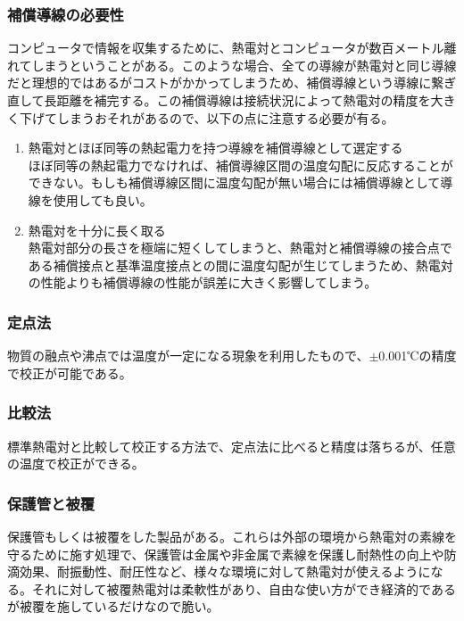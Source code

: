\documentclass[a4j,twoside,openright,11pt]{jarticle}
\begin{document}
\subsubsection{補償導線の必要性}
コンピュータで情報を収集するために、熱電対とコンピュータが数百メートル離れてしまうということがある。このような場合、全ての導線が熱電対と同じ導線だと理想的ではあるがコストがかかってしまうため、補償導線という導線に繋ぎ直して長距離を補完する。この補償導線は接続状況によって熱電対の精度を大きく下げてしまうおそれがあるので、以下の点に注意する必要が有る。
\begin{enumerate}
\item 熱電対とほぼ同等の熱起電力を持つ導線を補償導線として選定する\\
ほぼ同等の熱起電力でなければ、補償導線区間の温度勾配に反応することができない。もしも補償導線区間に温度勾配が無い場合には補償導線として導線を使用しても良い。
\item 熱電対を十分に長く取る\\
熱電対部分の長さを極端に短くしてしまうと、熱電対と補償導線の接合点である補償接点と基準温度接点との間に温度勾配が生じてしまうため、熱電対の性能よりも補償導線の性能が誤差に大きく影響してしまう。
\end{enumerate}

\subsubsection{定点法}
物質の融点や沸点では温度が一定になる現象を利用したもので、$\pm$0.001℃の精度で校正が可能である。
\subsubsection{比較法}
標準熱電対と比較して校正する方法で、定点法に比べると精度は落ちるが、任意の温度で校正ができる。

\subsubsection{保護管と被覆}
保護管もしくは被覆をした製品がある。これらは外部の環境から熱電対の素線を守るために施す処理で、保護管は金属や非金属で素線を保護し耐熱性の向上や防滴効果、耐振動性、耐圧性など、様々な環境に対して熱電対が使えるようになる。それに対して被覆熱電対は柔軟性があり、自由な使い方ができ経済的であるが被覆を施しているだけなので脆い。
\end{document}
